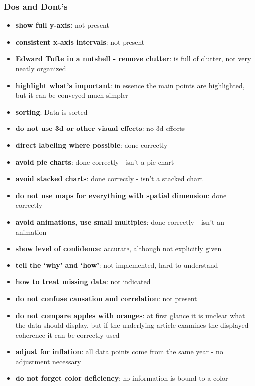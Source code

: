 \documentclass[a4paper]{article}
\begin{document}
    \subsubsection{Dos and Dont's}
    \begin{itemize}
        \item \textbf{show full y-axis:} not present
        \item \textbf{consistent x-axis intervals}: not present
        \item \textbf{Edward Tufte in a nutshell - remove clutter}: is full of clutter, not very neatly organized
        \item \textbf{highlight what’s important}: in essence the main points are highlighted, but it can be conveyed much simpler
        \item \textbf{sorting}: Data is sorted
        \item \textbf{do not use 3d or other visual effects}: no 3d effects
        \item \textbf{direct labeling where possible}: done correctly
        \item \textbf{avoid pie charts}: done correctly - isn't a pie chart
        \item \textbf{avoid stacked charts}: done correctly - isn't a stacked chart
        \item \textbf{do not use maps for everything with spatial dimension}: done correctly
        \item \textbf{avoid animations, use small multiples}: done correctly - isn't an animation
        \item \textbf{show level of confidence}: accurate, although not explicitly given
        \item \textbf{tell the ‘why’ and ‘how’}: not implemented, hard to understand
        \item \textbf{how to treat missing data}: not indicated
        \item \textbf{do not confuse causation and correlation}: not present
        \item \textbf{do not compare apples with oranges}: at first glance it is unclear what the data should display,
        but if the underlying article examines the displayed coherence it can be correctly used
        \item \textbf{adjust for inflation}: all data points come from the same year - no adjustment necessary
        \item \textbf{do not forget color deficiency}: no information is bound to a color
    \end{itemize}
\end{document}
